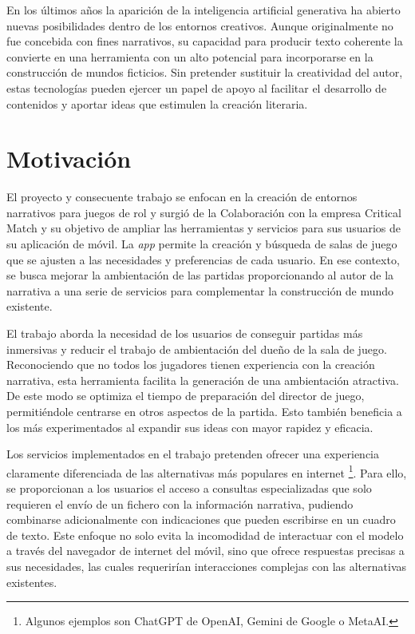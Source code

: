 En los últimos años la aparición de la inteligencia artificial generativa ha abierto nuevas posibilidades
dentro de los entornos creativos.
Aunque originalmente no fue concebida con fines narrativos, su capacidad para producir texto coherente
la convierte en una herramienta con un alto potencial para incorporarse en la construcción de mundos ficticios.
Sin pretender sustituir la creatividad del autor, estas tecnologías pueden ejercer un papel de apoyo
al facilitar el desarrollo de contenidos y aportar ideas que estimulen la creación literaria.


\section{Motivación}
El proyecto y consecuente trabajo se enfocan en la creación de entornos narrativos para juegos de rol 
y surgió de la Colaboración con la empresa Critical Match y su objetivo de ampliar las herramientas 
y servicios para sus usuarios de su aplicación de móvil.
La \textit{app} permite la creación y búsqueda de salas de juego que se ajusten a las necesidades y preferencias de cada usuario.
En ese contexto, se busca mejorar la ambientación de las partidas proporcionando al autor de la narrativa a una serie de servicios
para complementar la construcción de mundo existente.

El trabajo aborda la necesidad de los usuarios de conseguir partidas más inmersivas
y reducir el trabajo de ambientación del dueño de la sala de juego.
Reconociendo que no todos los jugadores tienen experiencia con la creación narrativa,
esta herramienta facilita la generación de una ambientación atractiva.
De este modo se optimiza el tiempo de preparación del director de juego, permitiéndole centrarse en otros aspectos de la partida.
Esto también beneficia a los más experimentados al expandir sus ideas con mayor rapidez y eficacia.

Los servicios implementados en el trabajo pretenden ofrecer una experiencia claramente diferenciada de las alternativas más populares en internet
\footnote{Algunos ejemplos son ChatGPT de OpenAI, Gemini de Google o MetaAI.}.
Para ello, se proporcionan a los usuarios el acceso a consultas especializadas que solo requieren el envío de un fichero
con la información narrativa, pudiendo combinarse adicionalmente con indicaciones que pueden escribirse en un cuadro de texto.
Este enfoque no solo evita la incomodidad de interactuar con el modelo a través del navegador de internet del móvil,
sino que ofrece respuestas precisas a sus necesidades, las cuales requerirían interacciones complejas
con las alternativas existentes.

